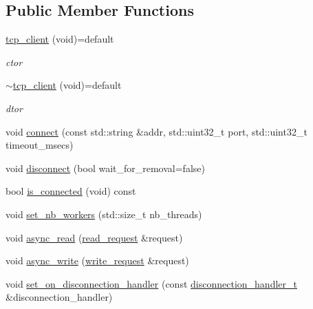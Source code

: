 \subsection*{Public Member Functions}
\begin{DoxyCompactItemize}
\item 
\hyperlink{classcpp__redis_1_1network_1_1tcp__client_a8cbad07ca636e9d60dafc0e5cac8106d}{tcp\+\_\+client} (void)=default
\begin{DoxyCompactList}\small\item\em ctor \end{DoxyCompactList}\item 
\hyperlink{classcpp__redis_1_1network_1_1tcp__client_af859036bbc7e5ec9149c1410a1a66f09}{$\sim$tcp\+\_\+client} (void)=default
\begin{DoxyCompactList}\small\item\em dtor \end{DoxyCompactList}\item 
void \hyperlink{classcpp__redis_1_1network_1_1tcp__client_a5808c0569980d83479f755ac55a12dfb}{connect} (const std\+::string \&addr, std\+::uint32\+\_\+t port, std\+::uint32\+\_\+t timeout\+\_\+msecs)
\item 
void \hyperlink{classcpp__redis_1_1network_1_1tcp__client_a88f49c4e32d59855a62296fb74136a44}{disconnect} (bool wait\+\_\+for\+\_\+removal=false)
\item 
bool \hyperlink{classcpp__redis_1_1network_1_1tcp__client_a0a636ca6bd59425bf22416a1c7694f65}{is\+\_\+connected} (void) const
\item 
void \hyperlink{classcpp__redis_1_1network_1_1tcp__client_aa56fc49540d67c5c05b3dda3aaff8a0f}{set\+\_\+nb\+\_\+workers} (std\+::size\+\_\+t nb\+\_\+threads)
\item 
void \hyperlink{classcpp__redis_1_1network_1_1tcp__client_a5eed4225fcd01e3108580d863c94c2cc}{async\+\_\+read} (\hyperlink{structcpp__redis_1_1network_1_1tcp__client__iface_1_1read__request}{read\+\_\+request} \&request)
\item 
void \hyperlink{classcpp__redis_1_1network_1_1tcp__client_a6d15785b71776cd85426c9634cb446f0}{async\+\_\+write} (\hyperlink{structcpp__redis_1_1network_1_1tcp__client__iface_1_1write__request}{write\+\_\+request} \&request)
\item 
void \hyperlink{classcpp__redis_1_1network_1_1tcp__client_a24ccdf6dc467aac13cb832a395adb38d}{set\+\_\+on\+\_\+disconnection\+\_\+handler} (const \hyperlink{classcpp__redis_1_1network_1_1tcp__client__iface_a9a7d5942205db8be03da581a848b8ec0}{disconnection\+\_\+handler\+\_\+t} \&disconnection\+\_\+handler)
\end{DoxyCompactItemize}
